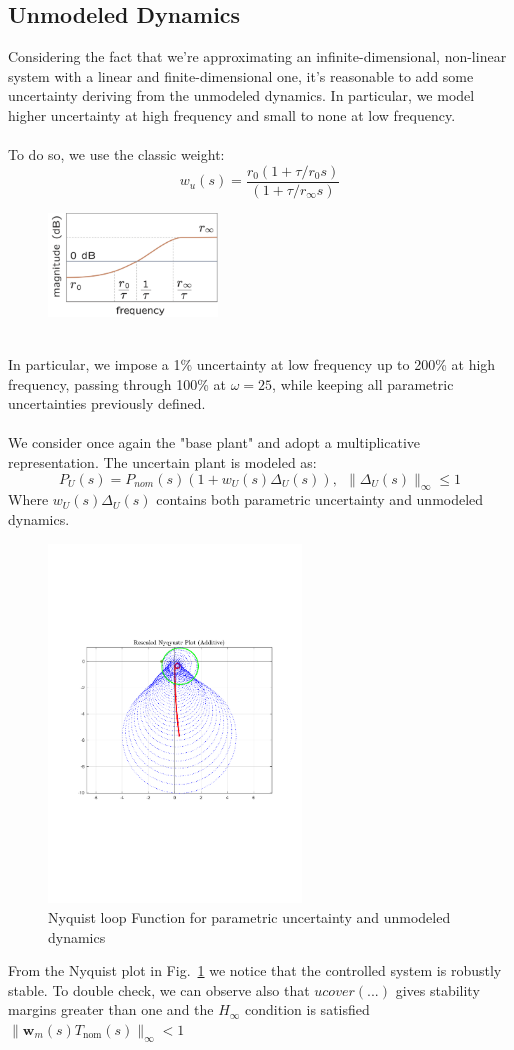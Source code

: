 \documentclass[a4paper, 12pt]{article}
\def\FigureTen{\centering\includegraphics[width=0.6\textwidth]{Figures/fig10.pdf}}
\begin{document}
\subsection{Unmodeled Dynamics}
Considering the fact that we're approximating an infinite-dimensional, non-linear system with a linear and finite-dimensional one, it's reasonable to add some uncertainty deriving from the unmodeled dynamics. In particular, we model higher uncertainty at high frequency and small to none at low frequency.
\\ \\
To do so, we use the classic weight:
\begin{equation*}
    w_u(s) = \frac{r_0 (1 + \tau/r_0 s)}{(1 + \tau/r_\infty s)}
\end{equation*}
\begin{figure}[h!]
        \centering
        \includegraphics[width=0.4\textwidth]{Figures/unmodelled.pdf}
\end{figure}
\\In particular, we impose a 1\% uncertainty at low frequency up to 200\% at high frequency, passing through 100\% at $\omega = 25$, while keeping all parametric uncertainties previously defined.
\\\\We consider once again the "base plant" and adopt a multiplicative representation. The uncertain plant is modeled as: 
\begin{equation*}
    P_{U}(s) = P_{nom}(s)(1+w_{U}(s) \Delta_{U}(s)), \ \ \|\Delta_{U}(s)\|_\infty \le 1
\end{equation*}
Where $w_{U}(s) \Delta_{U}(s)$ contains both parametric uncertainty and unmodeled dynamics.
\begin{figure}[h!]
    \FigureTen
    \caption{Nyquist loop Function for parametric uncertainty and unmodeled dynamics}
    \label{fig:fig10}
\end{figure}

From the Nyquist plot in Fig.~\ref{fig:fig10} we notice that the controlled system is robustly stable. 
To double check, we can observe also that $ucover(...)$ gives stability margins greater than one and the $H_\infty$ condition is satisfied $\|\mathbf{w}_m(s) T_{\text{nom}}(s)\|_\infty < 1$
\end{document}

